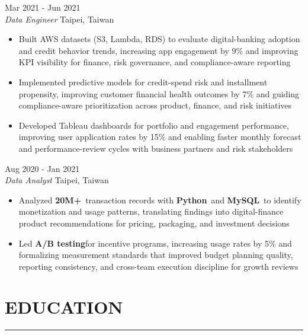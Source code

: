 \documentclass[11pt,letterpaper]{article}
\begin{document}
\vspace{0.42\baselineskip}
 \hfill Mar 2021 - Jun 2021\\[-1pt]
\textit{Data Engineer} \hfill Taipei, Taiwan
\begin{itemize}[leftmargin=1.5em, rightmargin=0pt, itemsep=0pt, topsep=0pt, parsep=0pt]
  \item \justifying Built AWS datasets (S3, Lambda, RDS) to evaluate digital-banking adoption and credit behavior trends, increasing app engagement by 9\% and improving KPI visibility for finance, risk governance, and compliance-aware reporting
  \item \justifying Implemented predictive models for credit-spend risk and installment propensity, improving customer financial health outcomes by 7\% and guiding compliance-aware prioritization across product, finance, and risk initiatives
  \item \justifying Developed Tableau dashboards for portfolio and engagement performance, improving user application rates by 15\% and enabling faster monthly forecast and performance-review cycles with business partners and risk stakeholders
\end{itemize}

\vspace{0.42\baselineskip}
 \hfill Aug 2020 - Jan 2021\\[-1pt]
\textit{Data Analyst} \hfill Taipei, Taiwan
\begin{itemize}[leftmargin=1.5em, rightmargin=0pt, itemsep=0pt, topsep=0pt, parsep=0pt]
  \item \justifying Analyzed \textbf{20M+}\ transaction records with \textbf{Python}\ and \textbf{MySQL}\ to identify monetization and usage patterns, translating findings into digital-finance product recommendations for pricing, packaging, and investment decisions
  \item \justifying Led \textbf{A/B testing}\hspace{0.25em}for incentive programs, increasing usage rates by 5\% and formalizing measurement standards that improved budget planning quality, reporting consistency, and cross-team execution discipline for growth reviews
\end{itemize}

\vspace{0.38\baselineskip}
\section*{EDUCATION}
\vspace{-8pt}\noindent\rule{\textwidth}{0.8pt}
\end{document}

